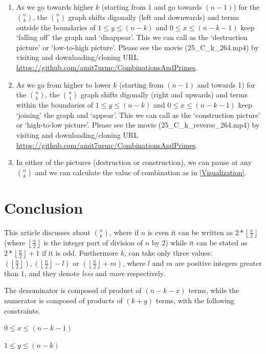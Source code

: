 \documentclass[10pt, twoside]{article}
\newcommand*{\Combination}[2]{\binom{#1}{#2}}%
\newcommand{\floordivision}[2]{\left\lfloor \frac{#1}{#2} \right\rfloor}
\begin{document}
\begin{enumerate}
	\item As we go towards higher $k$ (starting from $1$ and go towards $(n-1)$) for the $\Combination{n}{k}$, the $\Combination{n}{1}$ graph shifts digonally (left and downwards) and terms outside the boundaries of $ 1 \leq y \leq (n-k)$ and $0 \leq x \leq (n-k-1)$ keep `falling off' the graph and `disappear'. This we can call as the `destruction picture' or `low-to-high picture'. Please see the movie (25\_C\_k\_264.mp4) by visiting and downloading/cloning URL \url{https://github.com/amit7urmc/CombinationsAndPrimes}.
	\item As we go from higher to lower $k$ (starting from $(n-1)$ and towards 1) for the $\Combination{n}{k}$, the $\Combination{n}{1}$ graph shifts digonally (right and upwards) and terms within the boundaries of $ 1 \leq y \leq (n-k)$ and $0 \leq x \leq (n-k-1)$ keep `joining' the graph and `appear'. This we can call as the `construction picture' or `high-to-low picture'. Please see the movie (25\_C\_k\_reverse\_264.mp4) by visiting and downloading/cloning URL \url{https://github.com/amit7urmc/CombinationsAndPrimes}.
	\item In either of the pictures (destruction or construction), we can pause at any $\Combination{n}{k}$ and we can calculate the value of combination as in \ref{Visualization}.
	\end{enumerate} 
\section{Conclusion}\label{Summary}
This article discusses about $\Combination{n}{k}$, where if $n$ is even it can be written as $2*\floordivision{n}{2}$ (where $\floordivision{n}{2}$ is the integer part of division of $n$ by $2$) while it can be stated as $2*\floordivision{n}{2}+1$ if it is odd. Furthermore $k$, can take only three values: $(\floordivision{n}{2}), (\floordivision{n}{2} - l) \text{ or } (\floordivision{n}{2} + m)$, where $l$ and $m$ are positive integers greater than $1$, and they denote \textit{less} and \textit{more} respectively.

The denominator is composed of product of $(n-k-x)$ terms, while the numerator is composed of products of $(k+y)$ terms, with the following constraints.

$0 \leq x \leq (n-k-1)$

$1 \leq y \leq (n-k)$
\end{document}
